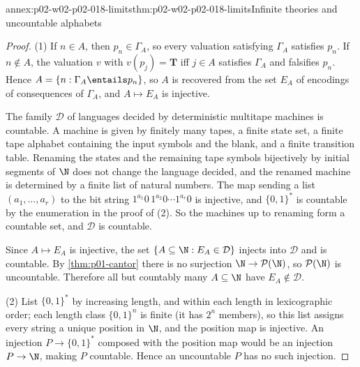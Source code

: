 \begin{annexitem}{annex:p02-w02-p02-018-limits}{thm:p02-w02-p02-018-limits}{Infinite theories and uncountable alphabets}
\begin{proof}
(1) If \(n\in A\), then \(p_n\in\Gamma_A\), so every valuation satisfying
\(\Gamma_A\) satisfies \(p_n\).  If \(n\notin A\), the valuation \(v\) with
\(v(p_j)=\mathbf T\) iff \(j\in A\) satisfies \(\Gamma_A\) and falsifies
\(p_n\).  Hence \(A=\{n:\Gamma_A\entails p_n\}\), so \(A\) is recovered from
the set \(E_A\) of encodings of consequences of \(\Gamma_A\), and
\(A\mapsto E_A\) is injective.

The family \(\mathcal D\) of languages decided by deterministic multitape
machines is countable.  A machine is given by finitely many tapes, a finite
state set, a finite tape alphabet containing the input symbols and the blank,
and a finite transition table.  Renaming the states and the remaining tape
symbols bijectively by initial segments of \(\N\) does not change the language
decided, and the renamed machine is determined by a finite list of natural
numbers.  The map sending a list \((a_1,\ldots,a_r)\) to the bit string
\(1^{a_1}0\,1^{a_2}0\cdots1^{a_r}0\) is injective, and \(\{0,1\}^*\) is
countable by the enumeration in the proof of (2).  So the machines up to
renaming form a countable set, and \(\mathcal D\) is countable.

Since \(A\mapsto E_A\) is injective, the set \(\{A\subseteq\N:E_A\in
\mathcal D\}\) injects into \(\mathcal D\) and is countable.  By
\cref{thm:p01-cantor} there is no surjection \(\N\to\mathcal P(\N)\), so
\(\mathcal P(\N)\) is uncountable.  Therefore all but countably many
\(A\subseteq\N\) have \(E_A\notin\mathcal D\).

(2) List \(\{0,1\}^*\) by increasing length, and within each length in
lexicographic order; each length class \(\{0,1\}^n\) is finite (it has
\(2^n\) members), so this list assigns every string a unique position in
\(\N\), and the position map is injective.  An injection \(P\to\{0,1\}^*\)
composed with the position map would be an injection \(P\to\N\), making \(P\)
countable.  Hence an uncountable \(P\) has no such injection.
\end{proof}
\end{annexitem}

